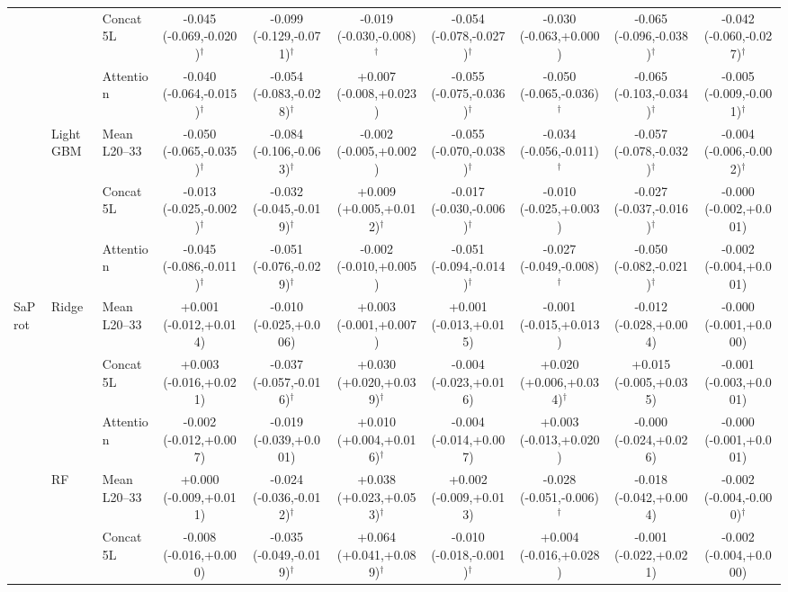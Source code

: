 \documentclass[11pt,a4paper]{article}
\begin{document}
\begin{landscape}
\begin{table}[p]
{\begin{tabular}{lllccccccc}
 &  & Concat 5L & -0.045 (-0.069,-0.020)$^{\dagger}$ & -0.099 (-0.129,-0.071)$^{\dagger}$ & -0.019 (-0.030,-0.008)$^{\dagger}$ & -0.054 (-0.078,-0.027)$^{\dagger}$ & -0.030 (-0.063,+0.000) & -0.065 (-0.096,-0.038)$^{\dagger}$ & -0.042 (-0.060,-0.027)$^{\dagger}$ \\
 &  & Attention & -0.040 (-0.064,-0.015)$^{\dagger}$ & -0.054 (-0.083,-0.028)$^{\dagger}$ & +0.007 (-0.008,+0.023) & -0.055 (-0.075,-0.036)$^{\dagger}$ & -0.050 (-0.065,-0.036)$^{\dagger}$ & -0.065 (-0.103,-0.034)$^{\dagger}$ & -0.005 (-0.009,-0.001)$^{\dagger}$ \\
\midrule
 & LightGBM & Mean L20--33 & -0.050 (-0.065,-0.035)$^{\dagger}$ & -0.084 (-0.106,-0.063)$^{\dagger}$ & -0.002 (-0.005,+0.002) & -0.055 (-0.070,-0.038)$^{\dagger}$ & -0.034 (-0.056,-0.011)$^{\dagger}$ & -0.057 (-0.078,-0.032)$^{\dagger}$ & -0.004 (-0.006,-0.002)$^{\dagger}$ \\
 &  & Concat 5L & -0.013 (-0.025,-0.002)$^{\dagger}$ & -0.032 (-0.045,-0.019)$^{\dagger}$ & +0.009 (+0.005,+0.012)$^{\dagger}$ & -0.017 (-0.030,-0.006)$^{\dagger}$ & -0.010 (-0.025,+0.003) & -0.027 (-0.037,-0.016)$^{\dagger}$ & -0.000 (-0.002,+0.001) \\
 &  & Attention & -0.045 (-0.086,-0.011)$^{\dagger}$ & -0.051 (-0.076,-0.029)$^{\dagger}$ & -0.002 (-0.010,+0.005) & -0.051 (-0.094,-0.014)$^{\dagger}$ & -0.027 (-0.049,-0.008)$^{\dagger}$ & -0.050 (-0.082,-0.021)$^{\dagger}$ & -0.002 (-0.004,+0.001) \\
\midrule
SaProt & Ridge & Mean L20--33 & +0.001 (-0.012,+0.014) & -0.010 (-0.025,+0.006) & +0.003 (-0.001,+0.007) & +0.001 (-0.013,+0.015) & -0.001 (-0.015,+0.013) & -0.012 (-0.028,+0.004) & -0.000 (-0.001,+0.000) \\
 &  & Concat 5L & +0.003 (-0.016,+0.021) & -0.037 (-0.057,-0.016)$^{\dagger}$ & +0.030 (+0.020,+0.039)$^{\dagger}$ & -0.004 (-0.023,+0.016) & +0.020 (+0.006,+0.034)$^{\dagger}$ & +0.015 (-0.005,+0.035) & -0.001 (-0.003,+0.001) \\
 &  & Attention & -0.002 (-0.012,+0.007) & -0.019 (-0.039,+0.001) & +0.010 (+0.004,+0.016)$^{\dagger}$ & -0.004 (-0.014,+0.007) & +0.003 (-0.013,+0.020) & -0.000 (-0.024,+0.026) & -0.000 (-0.001,+0.001) \\
\midrule
 & RF & Mean L20--33 & +0.000 (-0.009,+0.011) & -0.024 (-0.036,-0.012)$^{\dagger}$ & +0.038 (+0.023,+0.053)$^{\dagger}$ & +0.002 (-0.009,+0.013) & -0.028 (-0.051,-0.006)$^{\dagger}$ & -0.018 (-0.042,+0.004) & -0.002 (-0.004,-0.000)$^{\dagger}$ \\
 &  & Concat 5L & -0.008 (-0.016,+0.000) & -0.035 (-0.049,-0.019)$^{\dagger}$ & +0.064 (+0.041,+0.089)$^{\dagger}$ & -0.010 (-0.018,-0.001)$^{\dagger}$ & +0.004 (-0.016,+0.028) & -0.001 (-0.022,+0.021) & -0.002 (-0.004,+0.000) \\

\end{tabular}}
\end{table}
\end{landscape}
\end{document}
